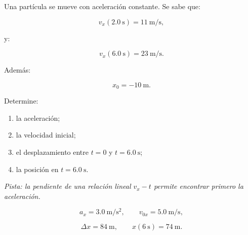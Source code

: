 \begin{ejercicio}
Una partícula se mueve con aceleración constante. Se sabe que:

\[
v_x(\SI{2.0}{\second})=\SI{11}{\meter\per\second},
\]

y:

\[
v_x(\SI{6.0}{\second})=\SI{23}{\meter\per\second}.
\]

Además:

\[ x_0=-\SI{10}{\meter}. \]

Determine:

\begin{enumerate}[label=\alph*)]
    \item la aceleración;
    \item la velocidad inicial;
    \item el desplazamiento entre \(t=0\) y \(t=\SI{6.0}{\second}\);
    \item la posición en \(t=\SI{6.0}{\second}\).
\end{enumerate}

\textit{Pista: la pendiente de una relación lineal \(v_x-t\) permite encontrar primero la aceleración.}
\end{ejercicio}

\begin{respuesta}
\[
a_x=\SI{3.0}{\meter\per\second\squared},
\qquad
v_{0x}=\SI{5.0}{\meter\per\second},
\]

\[
\Delta x=\SI{84}{\meter},
\qquad
x(\SI{6}{\second})=\SI{74}{\meter}.
\]
\end{respuesta}

